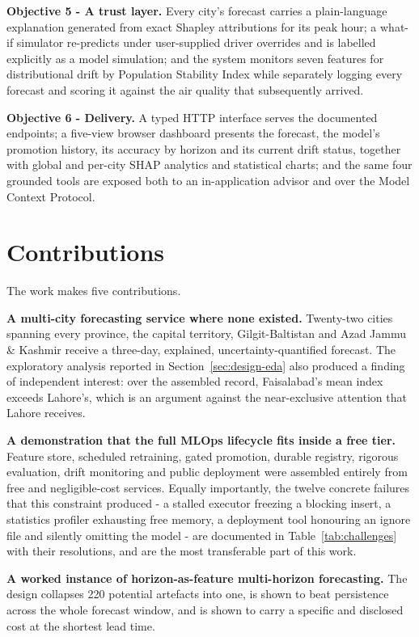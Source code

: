 \textbf{Objective 5 - A trust layer.} Every city's forecast carries a
plain-language explanation generated from exact Shapley attributions for its peak
hour; a what-if simulator re-predicts under user-supplied driver overrides and is
labelled explicitly as a model simulation; and the system monitors seven features
for distributional drift by Population Stability Index while separately logging
every forecast and scoring it against the air quality that subsequently arrived.

\textbf{Objective 6 - Delivery.} A typed HTTP interface serves the documented
endpoints; a five-view browser dashboard
presents the forecast, the model's promotion history, its accuracy by horizon and
its current drift status, together with global and per-city SHAP analytics and
statistical charts; and the same four grounded tools are exposed both to an
in-application advisor and over the Model Context Protocol.

\section{Contributions}
The work makes five contributions.

\textbf{A multi-city forecasting service where none existed.} Twenty-two cities
spanning every province, the capital territory, Gilgit-Baltistan and Azad Jammu
\& Kashmir receive a three-day, explained, uncertainty-quantified forecast. The
exploratory analysis reported in Section~\ref{sec:design-eda} also produced a
finding of independent interest: over the assembled record, Faisalabad's mean
index exceeds Lahore's, which is an argument against the near-exclusive attention
that Lahore receives.

\textbf{A demonstration that the full MLOps lifecycle fits inside a free tier.}
Feature store, scheduled retraining, gated promotion, durable registry, rigorous
evaluation, drift monitoring and public deployment were assembled entirely from
free and negligible-cost services. Equally importantly, the twelve concrete
failures that this constraint produced - a stalled executor freezing a blocking
insert, a statistics profiler exhausting free memory, a deployment tool honouring
an ignore file and silently omitting the model - are documented in
Table~\ref{tab:challenges} with their resolutions, and are the most transferable
part of this work.

\textbf{A worked instance of horizon-as-feature multi-horizon forecasting.} The
design collapses 220 potential artefacts into one, is shown to beat persistence
across the whole forecast window, and is shown to carry a specific and disclosed
cost at the shortest lead time.


